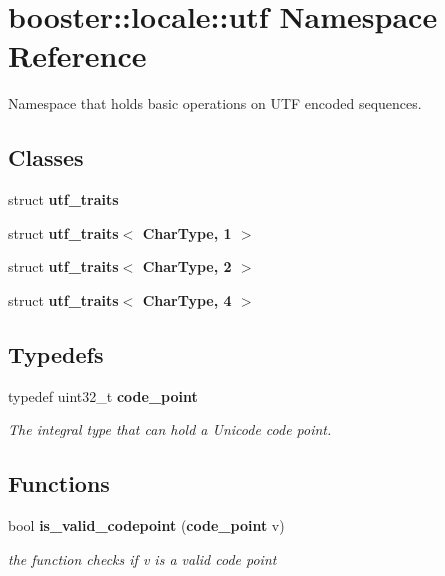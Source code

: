 \section{booster\+:\+:locale\+:\+:utf Namespace Reference}
\label{namespacebooster_1_1locale_1_1utf}


Namespace that holds basic operations on U\+TF encoded sequences.  


\subsection*{Classes}
\begin{DoxyCompactItemize}
\item 
struct {\bf utf\+\_\+traits}
\item 
struct {\bf utf\+\_\+traits$<$ Char\+Type, 1 $>$}
\item 
struct {\bf utf\+\_\+traits$<$ Char\+Type, 2 $>$}
\item 
struct {\bf utf\+\_\+traits$<$ Char\+Type, 4 $>$}
\end{DoxyCompactItemize}
\subsection*{Typedefs}
\begin{DoxyCompactItemize}
\item 
typedef uint32\+\_\+t {\bf code\+\_\+point}\label{namespacebooster_1_1locale_1_1utf_a99fa30e51629ed1d20e5989b9f36effc}

\begin{DoxyCompactList}\small\item\em The integral type that can hold a Unicode code point. \end{DoxyCompactList}\end{DoxyCompactItemize}
\subsection*{Functions}
\begin{DoxyCompactItemize}
\item 
bool {\bf is\+\_\+valid\+\_\+codepoint} ({\bf code\+\_\+point} v)\label{namespacebooster_1_1locale_1_1utf_a75c67e9ea9fa30bade54917264b1a19b}

\begin{DoxyCompactList}\small\item\em the function checks if {\itshape v} is a valid code point \end{DoxyCompactList}\end{DoxyCompactItemize}

